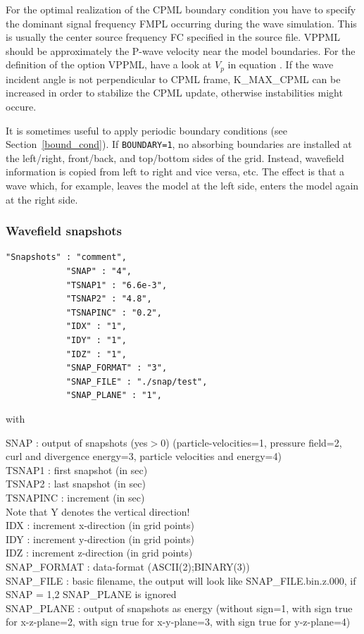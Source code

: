 \documentclass[11pt,onecolumn,oneside]{article}
\begin{document}
For the optimal realization of the CPML boundary condition you have to specify the dominant signal frequency FMPL occurring during the wave simulation. This is usually the center source frequency FC specified in the source file. VPPML should be approximately the P-wave velocity near the model boundaries. For the definition of the option VPPML, have a look at $V_p$ in equation . If the wave incident angle is not perpendicular to CPML frame, K\_MAX\_CPML can be increased in order to stabilize the CPML update, otherwise instabilities might occure.

It is sometimes useful to apply periodic boundary conditions (see
Section~\ref{bound_cond}). If \texttt{BOUNDARY=1}, no absorbing boundaries are
installed at the left/right, front/back, and top/bottom sides of the grid.
Instead, wavefield information is copied from left to right and vice versa,
etc. The effect is that a wave which, for example, leaves the model at the left
side, enters the model again at the right side.

\subsubsection{Wavefield snapshots}
\begin{verbatim}
"Snapshots" : "comment",
            "SNAP" : "4",
            "TSNAP1" : "6.6e-3",
            "TSNAP2" : "4.8",
            "TSNAPINC" : "0.2",
            "IDX" : "1",
            "IDY" : "1",
            "IDZ" : "1",
            "SNAP_FORMAT" : "3",
            "SNAP_FILE" : "./snap/test",
            "SNAP_PLANE" : "1",
\end{verbatim}

with

SNAP : output of snapshots (yes$>$0) (particle-velocities=1, pressure field=2, curl and divergence energy=3, particle velocities and energy=4)\\
TSNAP1 : first snapshot (in sec)\\
TSNAP2 : last snapshot (in sec)\\
TSNAPINC : increment (in sec)\\
Note that Y denotes the vertical direction!\\
IDX : increment x-direction (in grid points)\\
IDY : increment y-direction (in grid points)\\
IDZ : increment z-direction (in grid points)\\
SNAP\_FORMAT : data-format (ASCII(2);BINARY(3))\\
SNAP\_FILE : basic filename, the output will look like SNAP\_FILE.bin.z.000, if SNAP = 1,2 SNAP\_PLANE is ignored\\
SNAP\_PLANE : output of snapshots as energy (without sign=1, with sign true for x-z-plane=2, with sign true for x-y-plane=3, with sign true for y-z-plane=4)\\
\end{document}

